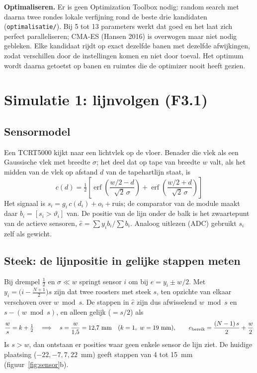 \documentclass[10pt,a4paper]{article}
\begin{document}
\textbf{Optimaliseren.} Er is geen Optimization Toolbox nodig: random search met daarna twee rondes
lokale verfijning rond de beste drie kandidaten (\texttt{optimalisatie/}). Bij 5 tot 13 parameters werkt
dat goed en het laat zich perfect paralleliseren; CMA-ES (Hansen 2016) is overwogen maar niet nodig
gebleken. Elke kandidaat rijdt op exact dezelfde banen met dezelfde afwijkingen, zodat verschillen door
de instellingen komen en niet door toeval. Het optimum wordt daarna getoetst op banen en ruimtes die de
optimizer nooit heeft gezien.

\section{Simulatie 1: lijnvolgen (F3.1)}

\subsection{Sensormodel}
Een TCRT5000 kijkt naar een lichtvlek op de vloer. Benader die vlek als een Gaussische vlek met breedte
$\sigma$; het deel dat op tape van breedte $w$ valt, als het midden van de vlek op afstand $d$ van de
tapehartlijn staat, is
\begin{equation}
c(d) = \tfrac12\left[\operatorname{erf}\!\left(\frac{w/2 - d}{\sqrt2\,\sigma}\right)
+ \operatorname{erf}\!\left(\frac{w/2 + d}{\sqrt2\,\sigma}\right)\right]
\label{eq:dekking}
\end{equation}
Het signaal is $s_i = g_i\,c(d_i) + o_i + \text{ruis}$; de comparator van de module maakt daar
$b_i = [s_i > \vartheta_i]$ van. De positie van de lijn onder de balk is het zwaartepunt van de actieve
sensoren, $\hat e = \sum y_i b_i / \sum b_i$. Analoog uitlezen (ADC) gebruikt $s_i$ zelf als gewicht.

\subsection{Steek: de lijnpositie in gelijke stappen meten}
Bij drempel $\tfrac12$ en $\sigma \ll w$ springt sensor $i$ om bij $e = y_i \pm w/2$. Met
$y_i = \bigl(i - \tfrac{N+1}{2}\bigr)s$ zijn dat twee roosters met steek $s$, ten opzichte van elkaar
verschoven over $w \bmod s$. De stappen in $\hat e$ zijn dus afwisselend $w \bmod s$ en
$s - (w \bmod s)$, en alleen gelijk ($= s/2$) als
\begin{equation}
\frac{w}{s} = k + \tfrac12 \quad\Longrightarrow\quad s = \frac{w}{1{,}5} = 12{,}7~\text{mm}
\quad (k = 1,\ w = 19~\text{mm}),
\qquad e_{\text{bereik}} = \frac{(N-1)\,s}{2} + \frac{w}{2}
\label{eq:steek}
\end{equation}
Is $s > w$, dan ontstaan er posities waar geen enkele sensor de lijn ziet. De huidige plaatsing
($-22, -7, 7, 22$~mm) geeft stappen van 4 tot 15~mm (figuur~\ref{fig:sensor}b).
\end{document}
